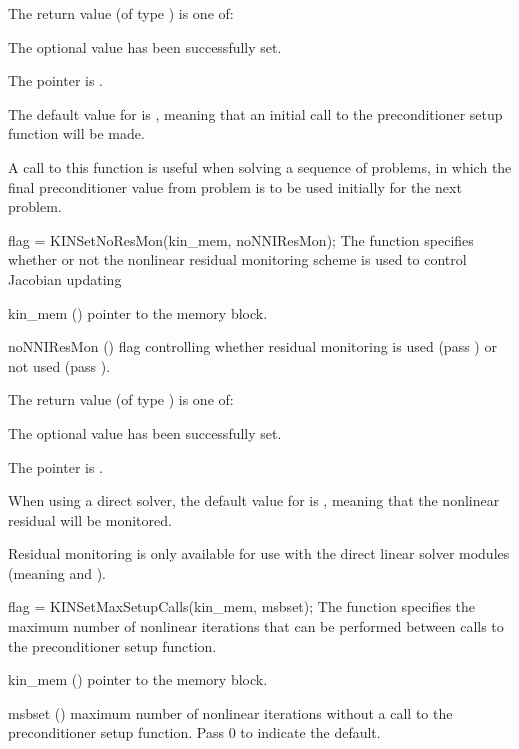{
  The return value  (of type ) is one of:
  \begin{args}
  \item[\Id{KIN\_SUCCESS}] 
    The optional value has been successfully set.
  \item[\Id{KIN\_MEM\_NULL}]
    The  pointer is .
  \end{args}
}
{
  The default value for  is , meaning that an initial call
  to the preconditioner setup function will be made.

  A call to this function is useful when solving a sequence of problems,
  in which the final preconditioner value from problem is to be used initially
  for the next problem. 
}
{
flag = KINSetNoResMon(kin\_mem, noNNIResMon);
}
{
  The function  specifies whether or not the nonlinear
  residual monitoring scheme is used to control Jacobian updating
}
{
  \begin{args}[noNNIResMon]
  \item[kin\_mem] ()
    pointer to the {\kinsol} memory block.
  \item[noNNIResMon] ()
    flag controlling whether residual monitoring is used (pass )
    or not used (pass ).

  \end{args}
}
{
  The return value  (of type ) is one of:
  \begin{args}
  \item[\Id{KIN\_SUCCESS}] 
    The optional value has been successfully set.
  \item[\Id{KIN\_MEM\_NULL}]
    The  pointer is .
  \end{args}
}
{
  When using a direct solver, the default value for  is ,
  meaning that the nonlinear residual will be monitored.

  {\warn}Residual monitoring is only available for use with the direct linear solver
  modules (meaning {\kindense} and {\kinband}).
}
{
flag = KINSetMaxSetupCalls(kin\_mem, msbset);
}
{
  The function  specifies the maximum number of 
  nonlinear iterations that can be performed between calls to the 
  preconditioner setup function.
}
{
  \begin{args}
  \item[kin\_mem] ()
    pointer to the {\kinsol} memory block.
  \item[msbset] ()
    maximum number of nonlinear iterations without a call to the
    preconditioner setup function.  Pass 0 to indicate the default.
  \end{args}
}

